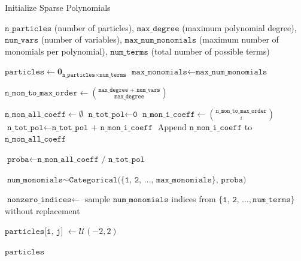 \documentclass[11pt]{article}
\begin{document}
\begin{algorithm}
	\caption{Initialize Sparse Polynomials}
	\label{alg:initialize-sparse}
	\begin{algorithmic}[1]
		\Require $\texttt{n\_particles}$ (number of particles), $\texttt{max\_degree}$ (maximum polynomial degree), $\texttt{num\_vars}$ (number of variables), $\texttt{max\_num\_monomials}$ (maximum number of monomials per polynomial), $\texttt{num\_terms}$ (total number of possible terms)
		
		\State $\texttt{particles} \leftarrow \mathbf{0}_{\texttt{n\_particles} \times \texttt{num\_terms}}$
		\State $\texttt{max\_monomials} \leftarrow \texttt{max\_num\_monomials}$
		
		\State $\texttt{n\_mon\_to\_max\_order} \leftarrow \binom{\texttt{max\_degree + num\_vars}}{\texttt{max\_degree}}$ 
		
		\State $\texttt{n\_mon\_all\_coeff} \leftarrow \emptyset$
		\State $\texttt{n\_tot\_pol} \leftarrow \texttt{0}$ 
		 
		\State $\texttt{n\_mon\_i\_coeff} \leftarrow \binom{\texttt{n\_mon\_to\_max\_order}}{i}$ 
		\State $\texttt{n\_tot\_pol} \leftarrow \texttt{n\_tot\_pol + n\_mon\_i\_coeff}$
		\State Append $\texttt{n\_mon\_i\_coeff}$ to $\texttt{n\_mon\_all\_coeff}$
		\EndFor
		
		\State $\texttt{proba} \leftarrow \texttt{n\_mon\_all\_coeff / n\_tot\_pol}$ 

		 

		\State $\texttt{num\_monomials} \sim \texttt{Categorical(\{1, 2, \ldots, max\_monomials\}, proba)}$ 
		
		\State $\texttt{nonzero\_indices}\leftarrow$ sample $\texttt{num\_monomials}$ indices from $\{\texttt{1, 2, }\ldots, \texttt{num\_terms}\}$ without replacement 
		
		 
		\State $\texttt{particles[i, j] }\leftarrow \mathcal{U}(-2,2)$ 
		\EndFor
		\EndFor
		
		\Return $\texttt{particles}$
	\end{algorithmic}
\end{algorithm}


\end{document}
